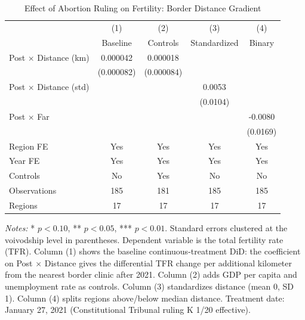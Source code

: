 \begin{table}[H]
\centering
\caption{Effect of Abortion Ruling on Fertility: Border Distance Gradient}
\begin{threeparttable}
\begin{tabular}{lcccc}
\toprule
 & (1) & (2) & (3) & (4) \\
 & Baseline & Controls & Standardized & Binary \\
\midrule
Post $\times$ Distance (km) & 0.000042 & 0.000018 & & \\
 & (0.000082) & (0.000084) & & \\
Post $\times$ Distance (std) & & & 0.0053 & \\
 & & & (0.0104) & \\
Post $\times$ Far & & & & -0.0080 \\
 & & & & (0.0169) \\
\midrule
Region FE & Yes & Yes & Yes & Yes \\
Year FE & Yes & Yes & Yes & Yes \\
Controls & No & Yes & No & No \\
Observations & 185 & 181 & 185 & 185 \\
Regions & 17 & 17 & 17 & 17 \\
\bottomrule
\end{tabular}
\begin{tablenotes}[flushleft]
\small
\item \textit{Notes:} * $p<0.10$, ** $p<0.05$, *** $p<0.01$. Standard errors clustered at the voivodship level in parentheses. Dependent variable is the total fertility rate (TFR). Column (1) shows the baseline continuous-treatment DiD: the coefficient on Post $\times$ Distance gives the differential TFR change per additional kilometer from the nearest border clinic after 2021. Column (2) adds GDP per capita and unemployment rate as controls. Column (3) standardizes distance (mean 0, SD 1). Column (4) splits regions above/below median distance. Treatment date: January 27, 2021 (Constitutional Tribunal ruling K 1/20 effective).
\end{tablenotes}
\end{threeparttable}
\label{tab:main}
\end{table}

